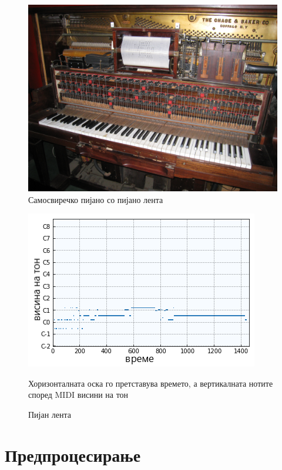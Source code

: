 \begin{figure}[H]
	\centering
\includegraphics[scale=.3]{images/piano.jpeg}
	\caption{Самосвиречко пијано со пијано лента}
	\label{fig:piano_pr}
\end{figure}

\begin{figure}[H]
	\centering
\includegraphics[scale=1.3]{images/piano_roll.png}
	\caption{Пијан лента}
	Хоризонталната оска го претставува времето, а вертикалната нотите според MIDI висини на тон
	\label{fig:piano_roll}
\end{figure}

\section{Предпроцесирање}

